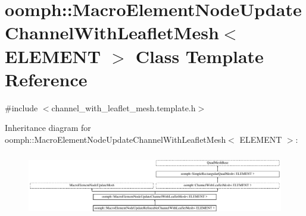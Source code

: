 \hypertarget{classoomph_1_1MacroElementNodeUpdateChannelWithLeafletMesh}{}\section{oomph\+:\+:Macro\+Element\+Node\+Update\+Channel\+With\+Leaflet\+Mesh$<$ E\+L\+E\+M\+E\+NT $>$ Class Template Reference}
\label{classoomph_1_1MacroElementNodeUpdateChannelWithLeafletMesh}


{\ttfamily \#include $<$channel\+\_\+with\+\_\+leaflet\+\_\+mesh.\+template.\+h$>$}

Inheritance diagram for oomph\+:\+:Macro\+Element\+Node\+Update\+Channel\+With\+Leaflet\+Mesh$<$ E\+L\+E\+M\+E\+NT $>$\+:\begin{figure}[H]
\begin{center}
\leavevmode
\includegraphics[height=2.828283cm]{classoomph_1_1MacroElementNodeUpdateChannelWithLeafletMesh}
\end{center}
\end{figure}
